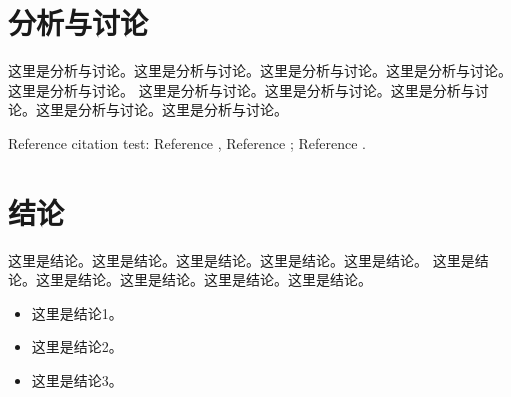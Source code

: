 \section{分析与讨论}

这里是分析与讨论。这里是分析与讨论。这里是分析与讨论。这里是分析与讨论。这里是分析与讨论。
这里是分析与讨论。这里是分析与讨论。这里是分析与讨论。这里是分析与讨论。这里是分析与讨论。


Reference citation test: Reference \cite{CHEN20092657}, Reference \cite{CHEN20092657, Tang2023, Yin2021}; Reference \cite{CHEN20092657,Tang2023,ZHU2023119062}.


\section{结论}

这里是结论。这里是结论。这里是结论。这里是结论。这里是结论。
这里是结论。这里是结论。这里是结论。这里是结论。这里是结论。


\begin{itemize}
    \item 这里是结论1。
    \item 这里是结论2。
    \item 这里是结论3。
\end{itemize}


\newpage
